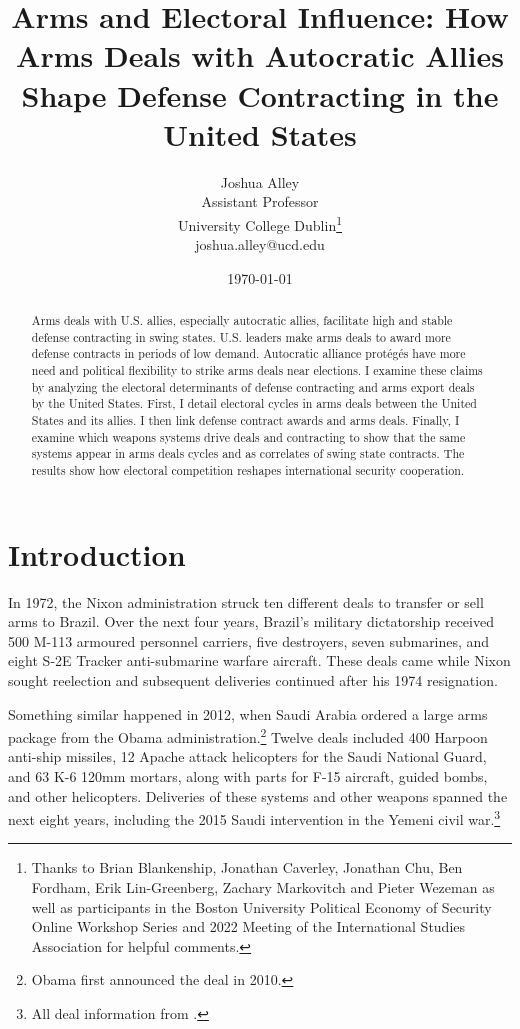 \documentclass[12pt]{article}
\title{\textbf{Arms and Electoral Influence: How Arms Deals with Autocratic Allies Shape Defense Contracting in the United States}}
\author{Joshua Alley \\
Assistant Professor \\
University College Dublin\thanks{Thanks to Brian Blankenship, Jonathan Caverley, Jonathan Chu, Ben Fordham, Erik Lin-Greenberg, Zachary Markovitch and Pieter Wezeman as well as participants in the Boston University Political Economy of Security Online Workshop Series and 2022 Meeting of the International Studies Association for helpful comments.} \\
joshua.alley@ucd.edu
}
\date{\today}
\begin{document}
\maketitle 

\begin{abstract} 
Arms deals with U.S. allies, especially autocratic allies, facilitate high and stable defense contracting in swing states. 
U.S. leaders make arms deals to award more defense contracts in periods of low demand.
Autocratic alliance prot{\'e}g{\'e}s have more need and political flexibility to strike arms deals near elections. 
I examine these claims by analyzing the electoral determinants of defense contracting and arms export deals by the United States.  
First, I detail electoral cycles in arms deals between the United States and its allies. 
I then link defense contract awards and arms deals.
Finally, I examine which weapons systems drive deals and contracting to show that the same systems appear in arms deals cycles and as correlates of swing state contracts.  
The results show how electoral competition reshapes international security cooperation.
\end{abstract} 


\newpage 
\doublespace 


\section{Introduction}



In 1972, the Nixon administration struck ten different deals to transfer or sell arms to Brazil.
Over the next four years, Brazil's military dictatorship received 500 M-113 armoured personnel carriers, five destroyers, seven submarines, and eight S-2E Tracker anti-submarine warfare aircraft.
These deals came while Nixon sought reelection and subsequent deliveries continued after his 1974 resignation. 


Something similar happened in 2012, when Saudi Arabia ordered a large arms package from the Obama administration.\footnote{Obama first announced the deal in 2010.} 
Twelve deals included 400 Harpoon anti-ship missiles, 12 Apache attack helicopters for the Saudi National Guard, and 63 K-6 120mm mortars, along with parts for F-15 aircraft, guided bombs, and other helicopters. 
Deliveries of these systems and other weapons spanned the next eight years, including the 2015 Saudi intervention in the Yemeni civil war.\footnote{All deal information from \citep{Sipri2022}.}
\end{document}
